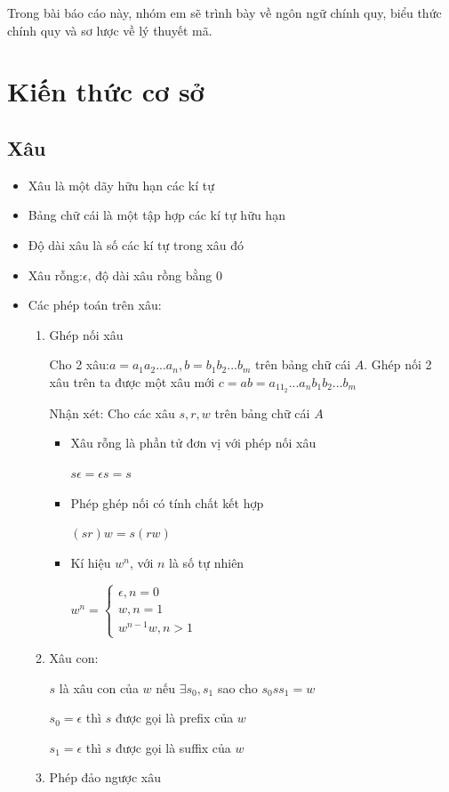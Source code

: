 \documentclass[14pt]{extreport}
\begin{document}
Trong bài báo cáo này, nhóm em sẽ trình bày về ngôn ngữ chính quy, biểu thức chính quy và sơ lược về lý thuyết mã.


\chapter{Kiến thức cơ sở}
\section{Xâu}
\begin{itemize}
\item Xâu là một dãy hữu hạn các kí tự 
\item Bảng chữ cái là một tập hợp các kí tự hữu hạn
\item Độ dài xâu là số các kí tự trong xâu đó
\item Xâu rỗng:$\epsilon$, độ dài xâu rồng bằng 0
\item Các phép toán trên xâu:
\begin{enumerate}
\item Ghép nối xâu

Cho 2 xâu:$a=a_1a_2...a_n,b=b_1b_2...b_m$ trên bảng chữ cái $A$. Ghép nối 2 xâu trên ta được một xâu mới $c=ab=a_11_2...a_nb_1b_2...b_m$

Nhận xét: Cho các xâu $s,r,w$ trên bảng chữ cái $A$
\begin{itemize}
\item Xâu rỗng là phần tử đơn vị với phép nối xâu

$s\epsilon =\epsilon s=s$
\item Phép ghép nối có tính chất kết hợp

$\left(sr\right)w=s\left(rw\right)$
\item Kí hiệu $w^n$, với $n$ là số tự nhiên

$w^n=\left\{\begin{matrix}
\epsilon ,n=0\\ 
w,n=1\\ 
w^{n-1}w, n>1
\end{matrix}\right.$
\end{itemize}
\item Xâu con:

$s$ là xâu con của $w$ nếu $\exists s_0,s_1$ sao cho $s_0ss_1=w$

$s_0=\epsilon$ thì $s$ được gọi là prefix của $w$

$s_1=\epsilon$ thì $s$ được gọi là suffix của $w$
\item Phép đảo ngược xâu


\end{enumerate}
\end{itemize}
\end{document}
